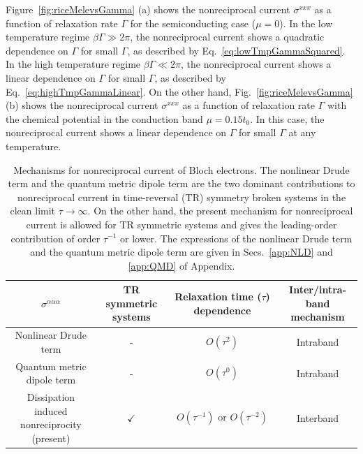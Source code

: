 \documentclass[twocolumn,superscriptaddress]{revtex4-1}
\begin{document}
Figure~\ref{fig:riceMelevsGamma} (a) shows the nonreciprocal current $\sigma^{xxx}$ as a function of relaxation rate $\Gamma$ for the semiconducting case ($\mu=0$).
In the low temperature regime $\beta \Gamma \gg 2\pi$, the nonreciprocal current shows a quadratic dependence on $\Gamma$ for small $\Gamma$, as described by Eq.~\eqref{eq:lowTmpGammaSquared}.
In the high temperature regime $\beta \Gamma \ll 2\pi$, the nonreciprocal current shows a linear dependence on $\Gamma$ for small $\Gamma$, as described by Eq.~\eqref{eq:highTmpGammaLinear}.
On the other hand, Fig.~\ref{fig:riceMelevsGamma} (b) shows the nonreciprocal current $\sigma^{xxx}$ as a function of relaxation rate $\Gamma$ with the chemical potential in the conduction band $\mu=0.15t_0$.
In this case, the nonreciprocal current shows a linear dependence on $\Gamma$ for small $\Gamma$ at any temperature.


\begin{table}[t]
  \begin{tabular}{c|c|c|c}
  \hline\hline
     $\sigma^{\alpha\alpha\alpha}$&TR symmetric systems &Relaxation time ($\tau$) dependence & Inter/intra-band mechanism\\
    \hline
    Nonlinear Drude term & - &$O(\tau^{2})$ &Intraband \\
    Quantum metric dipole term& - &  $O(\tau^{0})$ &Intraband\\
    Dissipation induced nonreciprocity (present) & $\checkmark$ & $O(\tau^{-1}) \text{ or } O(\tau^{-2})$ &Interband \\
    \hline\hline
  \end{tabular}
  \caption{
    Mechanisms for nonreciprocal current of Bloch electrons. The nonlinear Drude term and the quantum metric dipole term are the two dominant contributions to nonreciprocal current in time-reversal (TR) symmetry broken systems in the clean limit $\tau \to \infty$. On the other hand, the present mechanism for nonreciprocal current is allowed for TR symmetric systems and gives the leading-order contribution of order $\tau^{-1}$ or lower.
    The expressions of the nonlinear Drude term and the quantum metric dipole term are given in Secs.~\ref{app:NLD} and \ref{app:QMD} of Appendix.
  }
  \label{tab:comparison}
\end{table}
\end{document}
